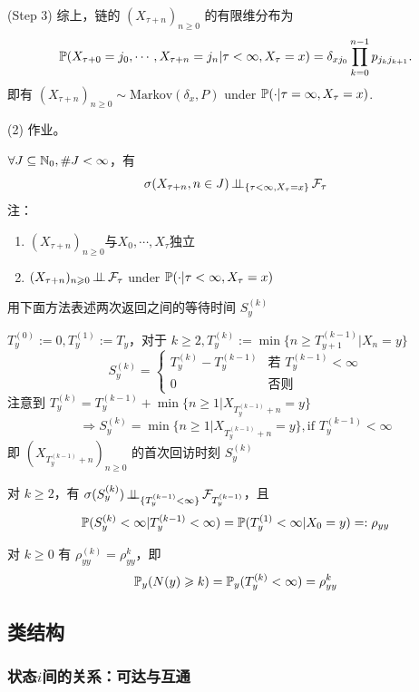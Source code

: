 (Step 3) 综上，链的 \((X_{\tau + n})_{n \geq 0}\) 的有限维分布为
\[
\mathbb{P}(X_{\tau + 0} = j_0, \cdots, X_{\tau + n} = j_n | \tau < \infty, X_\tau = x) = \delta_{x j_0} \prod_{k=0}^{n-1} p_{j_k j_{k+1}}.
\]
即有 \((X_{\tau + n})_{n \geq 0} \sim \text{Markov}(\delta_x, P)\) under $\mathbb{P}(\cdot|\tau=\infty,X_{\tau}=x)$.

(2) 作业。

\begin{problem}[作业5-3]
$\forall J\subseteq \mathbb{N}_0, \#J<\infty$，有
\[
\sigma(X_{\tau+n},n\in J)\operatorname{\perp\!\!\!\perp}_{\{\tau<\infty,X_{\tau}=x\}}\mathcal{F}_{\tau}
\]
注：\begin{enumerate}
    \item $(X_{\tau+n})_{n\geq 0}$与$X_0,\cdots,X_{\tau}$独立
    \item $(X_{\tau+n})_{n\geqslant 0}\operatorname{\perp\!\!\!\perp} \mathcal{F}_{\tau}$ under $\mathbb{P}(\cdot|\tau<\infty,X_{\tau}=x)$
\end{enumerate}
\end{problem}

用下面方法表述两次返回之间的等待时间 $S_y^{(k)}$

$T_y^{(0)}:=0, T_y^{(1)}:=T_y$，对于 $k\geq 2, T_y^{(k)}:=\min\{n\geq T_{y+1}^{(k-1)}|X_n=y\}$
\[
S_y^{(k)}=\begin{cases}
    T_y^{(k)}-T_y^{(k-1)}&\text{若 }T_y^{(k-1)}<\infty\\
    0 & \text{否则}
\end{cases}
\]
注意到 $T_y^{(k)}=T_y^{(k-1)}+\min\{n\geq 1|X_{T_y^{(k-1)}+n}=y\}$
\[
\Rightarrow S_y^{(k)}=\min\{n\geq 1|X_{T_y^{(k-1)}+n}=y\}, \text{if }T_y^{(k-1)}<\infty
\]
即 $(X_{T_y^{(k-1)}+n})_{n\geq 0}$ 的首次回访时刻 $S_y^{(k)}$

\begin{lemma}
    对 $k\geq 2$，有 $\sigma(S_y^{(k)})\operatorname{\perp\!\!\!\perp}_{\{T_y^{(k-1)}<\infty\}}\mathcal{F}_{T_y^{(k-1)}}$，且\
    \[
    \mathbb{P}(S_y^{(k)}<\infty|T_y^{(k-1)}<\infty)=\mathbb{P}(T_y^{(1)}<\infty|X_0=y)=:\rho_{yy}
    \]
\end{lemma}

\begin{corollary}
    对 $k\geq 0$ 有 $\rho_{yy}^{(k)}=\rho_{yy}^k$，即
    \[
    \mathbb{P}_y(N(y)\geqslant k)=\mathbb{P}_y(T_y^{(k)}<\infty)=\rho_{yy}^k
    \]
\end{corollary}

\subsection{类结构}
\subsubsection{状态$i$间的关系：可达与互通}

